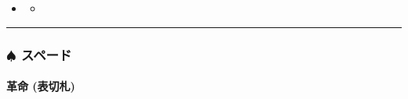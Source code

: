 \documentclass[letterpaper,10pt,dvipdfmx]{sphinxmanual}
\begin{document}
\begin{sphinxShadowBox}
\begin{itemize}
\begin{itemize}
\item {} 
\sphinxAtStartPar
{}\label{\detokenize{auto/frameActionlist:id300}}{\hyperref[\detokenize{auto/frameActionlist:trump-c8}]{}}

\item {} 
\sphinxAtStartPar
{}\label{\detokenize{auto/frameActionlist:id301}}{\hyperref[\detokenize{auto/frameActionlist:trump-c9}]{}}

\item {} 
\sphinxAtStartPar
{}\label{\detokenize{auto/frameActionlist:id302}}{\hyperref[\detokenize{auto/frameActionlist:trump-c10}]{}}

\item {} 
\sphinxAtStartPar
{}\label{\detokenize{auto/frameActionlist:id303}}{\hyperref[\detokenize{auto/frameActionlist:trump-cj}]{}}

\end{itemize}

\item {} 
\sphinxAtStartPar
{}\label{\detokenize{auto/frameActionlist:id304}}{\hyperref[\detokenize{auto/frameActionlist:id139}]{}}
\begin{itemize}
\item {} 
\sphinxAtStartPar
{}\label{\detokenize{auto/frameActionlist:id305}}{\hyperref[\detokenize{auto/frameActionlist:trump-secrettrump}]{}}

\end{itemize}

\end{itemize}
\end{sphinxShadowBox}


\bigskip\hrule\bigskip



\subsubsection{{\normalsize $\spadesuit$} スペード}
\label{\detokenize{auto/frameActionlist:id105}}

\paragraph{革命 (表切札)}
\label{\detokenize{auto/frameActionlist:trump-sa}}\label{\detokenize{auto/frameActionlist:id106}}
\sphinxAtStartPar
{}
\end{document}

